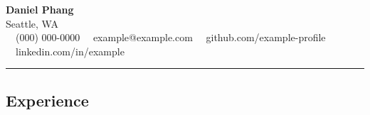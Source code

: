 \documentclass[11pt,letterpaper]{article}
\begin{document}
\begin{center}

{\LARGE \textbf{Daniel Phang}}\\
Seattle, WA
\vspace{0.05cm}
\\
\raisebox{-0.2\height} {\Large \faPhoneSquare} \ \  (000) 000-0000 \hfill\raisebox{-0.2\height}{\Large \faEnvelopeSquare} \ \ example@example.com \hfill \raisebox{-0.2\height}{\Large \faGithubSquare} \ \ github.com/example-profile \hfill \raisebox{-0.2\height}{\Large \faLinkedinSquare} \ \ linkedin.com/in/example
\end{center}

\hrule
\vspace{-1em}
\subsection*{\Large Experience}
\end{document}
